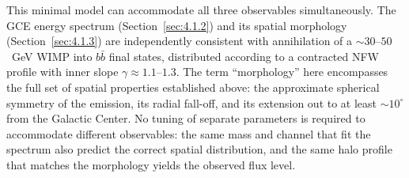 This minimal model can accommodate all three observables simultaneously.
The GCE energy spectrum (Section~\ref{sec:4.1.2}) and its spatial morphology (Section~\ref{sec:4.1.3}) are independently consistent with annihilation of a $\sim 30$--$50$~GeV WIMP into $b\bar{b}$ final states, distributed according to a contracted NFW profile with inner slope $\gamma \approx 1.1$--$1.3$.
The term ``morphology'' here encompasses the full set of spatial properties established above: the approximate spherical symmetry of the emission, its radial fall-off, and its extension out to at least $\sim 10^\circ$ from the Galactic Center.
No tuning of separate parameters is required to accommodate different observables: the same mass and channel that fit the spectrum also predict the correct spatial distribution, and the same halo profile that matches the morphology yields the observed flux level.

